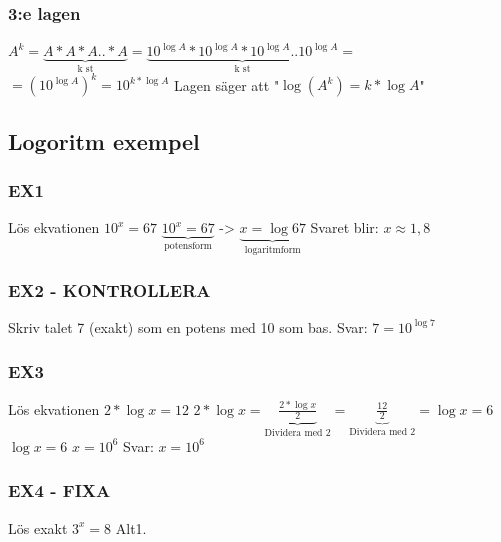 \documentclass[a4paper,10pt]{article}
\begin{document}
\begin{flushleft}
  \subsubsection{3:e lagen}
    $A^k = \underbrace{A*A*A..*A}_{\text{k st}} = \underbrace{10^{\log{A}}*10^{\log{A}}*10^{\log{A}}..10^{\log{A}}}_{\text{k st}} = $\newline
    $= (10^{\log{A}})^k = 10^{k*\log{A}}$\newline\newline
    Lagen säger att "$\log(A^k) = k*\log{A} $"

  \subsection{Logoritm exempel}
    \subsubsection{EX1}
      Lös ekvationen $ 10^x = 67 $\newline\newline
      $ \underbrace{10^x = 67}_{\text{potensform}} $ -> $ \underbrace{x=\log{67}}_{\text{logaritmform}} $\newline
      Svaret blir: $ x \approx 1,8 $

    \subsubsection{EX2 - KONTROLLERA}
    Skriv talet 7 (exakt) som en potens med 10 som bas.\newline\newline
    Svar: $ 7 = 10^{\log{7}} $

  \subsubsection{EX3}
    Lös ekvationen $ 2*\log{x}=12 $\newline\newline
    $ 2*\log{x} = \underbrace{\frac{2*\log{x}}{2}}_{\text{Dividera med 2}} = \underbrace{\frac{12}{2}}_{\text{Dividera med 2}} = \log{x}=6 $ \newline\newline
    $ \log{x} = 6 $\newline
    $ x = 10^6 $\newline\newline
    Svar: $ x = 10^6$
  \subsubsection{EX4 - FIXA}
    Lös exakt $ 3^x = 8 $\newline\newline
    Alt1.\newline


\end{flushleft}
\end{document}
